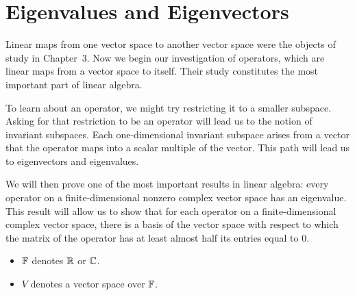 \chapter{Eigenvalues and Eigenvectors}

Linear maps from one vector space to another vector space were the objects of
study in Chapter~3. Now we begin our investigation of operators, which are
linear maps from a vector space to itself. Their study constitutes the most
important part of linear algebra.

To learn about an operator, we might try restricting it to a smaller subspace.
Asking for that restriction to be an operator will lead us to the notion of
invariant subspaces. Each one-dimensional invariant subspace arises from a
vector that the operator maps into a scalar multiple of the vector. This path
will lead us to eigenvectors and eigenvalues.

We will then prove one of the most important results in linear algebra: every
operator on a finite-dimensional nonzero complex vector space has an
eigenvalue. This result will allow us to show that for each operator on a
finite-dimensional complex vector space, there is a basis of the vector space
with respect to which the matrix of the operator has at least almost half its
entries equal to $0$.

\begin{definition*}\leavevmode
\begin{itemize}
\item $\mathbb{F}$ denotes $\mathbb{R}$ or $\mathbb{C}$.
\item $V$ denotes a vector space over $\mathbb{F}$.
\end{itemize}
\end{definition*}
